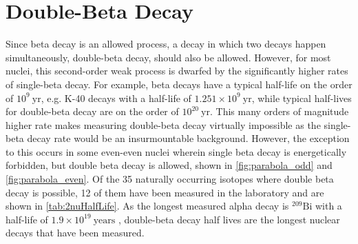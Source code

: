 \section{Double-Beta Decay}
\label{sec:Double Beta Decay}
Since beta decay is an allowed process, a decay in which two decays happen simultaneously, double-beta decay, should also be allowed. However, for most nuclei, this second-order weak process is dwarfed by the significantly higher rates of single-beta decay. For example, beta decays have a typical half-life on the order of $10^9~\textrm{yr}$, e.g. K-40 decays with a half-life of $1.251\times10^{9}~\textrm{yr}$, while typical half-lives for double-beta decay are on the order of $10^{20}~\textrm{yr}$. This many orders of magnitude higher rate makes measuring double-beta decay virtually impossible as the single-beta decay rate would be an insurmountable background. However, the exception to this occurs in some even-even nuclei wherein single beta decay is energetically forbidden, but double beta decay is allowed, shown in \autoref{fig:parabola_odd} and \autoref{fig:parabola_even}. Of the 35 naturally occurring isotopes where double beta decay is possible, 12 of them have been measured in the laboratory and are shown in \autoref{tab:2nuHalfLife}. As the longest measured alpha decay is $^{209}\textrm{Bi}$ with a half-life of $1.9 \times 10^{19}~\textrm{years}$ \cite{Marcillac:2003Bi-209detection}, double-beta decay half lives are the longest nuclear decays that have been measured.

